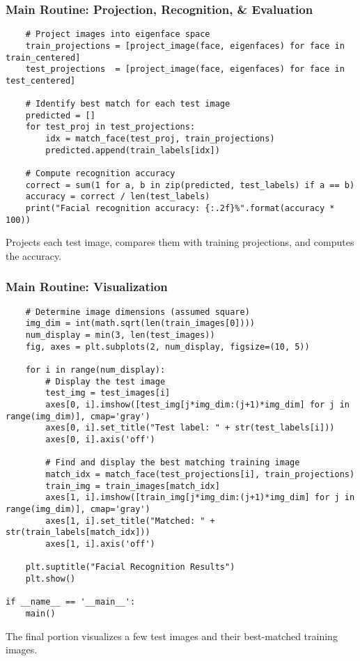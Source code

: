 \documentclass{beamer}
\begin{document}
\begin{frame}[fragile]
  \frametitle{Main Routine: Projection, Recognition, \& Evaluation}
  \begin{lstlisting}
    # Project images into eigenface space
    train_projections = [project_image(face, eigenfaces) for face in train_centered]
    test_projections  = [project_image(face, eigenfaces) for face in test_centered]
    
    # Identify best match for each test image
    predicted = []
    for test_proj in test_projections:
        idx = match_face(test_proj, train_projections)
        predicted.append(train_labels[idx])
    
    # Compute recognition accuracy
    correct = sum(1 for a, b in zip(predicted, test_labels) if a == b)
    accuracy = correct / len(test_labels)
    print("Facial recognition accuracy: {:.2f}%".format(accuracy * 100))
  \end{lstlisting}
  Projects each test image, compares them with training projections, and computes the accuracy.
\end{frame}

\begin{frame}[fragile]
  \frametitle{Main Routine: Visualization}
  \begin{lstlisting}
    # Determine image dimensions (assumed square)
    img_dim = int(math.sqrt(len(train_images[0])))
    num_display = min(3, len(test_images))
    fig, axes = plt.subplots(2, num_display, figsize=(10, 5))
    
    for i in range(num_display):
        # Display the test image
        test_img = test_images[i]
        axes[0, i].imshow([test_img[j*img_dim:(j+1)*img_dim] for j in range(img_dim)], cmap='gray')
        axes[0, i].set_title("Test label: " + str(test_labels[i]))
        axes[0, i].axis('off')
        
        # Find and display the best matching training image
        match_idx = match_face(test_projections[i], train_projections)
        train_img = train_images[match_idx]
        axes[1, i].imshow([train_img[j*img_dim:(j+1)*img_dim] for j in range(img_dim)], cmap='gray')
        axes[1, i].set_title("Matched: " + str(train_labels[match_idx]))
        axes[1, i].axis('off')
        
    plt.suptitle("Facial Recognition Results")
    plt.show()

if __name__ == '__main__':
    main()
  \end{lstlisting}
  The final portion visualizes a few test images and their best-matched training images.
\end{frame}
\end{document}
